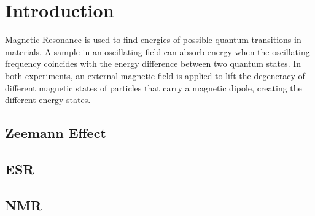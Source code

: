 \chapter{Introduction}
Magnetic Resonance is used to find energies of possible quantum transitions in materials.
A sample in an oscillating field can absorb energy when the oscillating frequency coincides with the energy difference between two quantum states. %
In both experiments, an external magnetic field is applied to lift the degeneracy of different magnetic states of particles that carry a magnetic dipole, creating the different energy states.

\section{Zeemann Effect}


\section{ESR}

\section{NMR}
